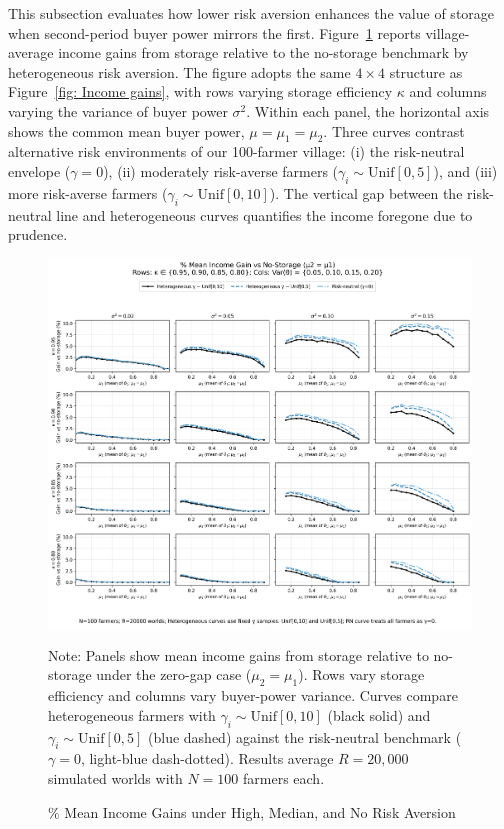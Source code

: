 This subsection evaluates how lower risk aversion enhances the value of storage when second-period buyer power mirrors the first. Figure~\ref{fig: Income gains with RN case} reports village-average income gains from storage relative to the no-storage benchmark by heterogeneous risk aversion. The figure adopts the same $4\times4$ structure as Figure~\ref{fig: Income gains}, with rows varying storage efficiency $\kappa$ and columns varying the variance of buyer power $\sigma^2$. Within each panel, the horizontal axis shows the common mean buyer power, $\mu=\mu_1=\mu_2$. Three curves contrast alternative risk environments of our 100-farmer village: (i) the risk-neutral envelope ($\gamma=0$), (ii) moderately risk-averse farmers ($\gamma_i\sim \mathrm{Unif}[0,5]$), and (iii) more risk-averse farmers ($\gamma_i\sim \mathrm{Unif}[0,10]$). The vertical gap between the risk-neutral line and heterogeneous curves quantifies the income foregone due to prudence.

\begin{figure}[ht]
    \centering
    \includegraphics[width=\linewidth]{model_figures/gainpct_grid_4x4_zero_gap_three_curves.png}
    \caption{$\%$ Mean Income Gains under High, Median, and No Risk Aversion}
    \label{fig: Income gains with RN case}
    \begin{tablenotes}[flushleft]
    \footnotesize
    \item Note: Panels show mean income gains from storage relative to no-storage under the zero-gap case ($\mu_2=\mu_1$). Rows vary storage efficiency and columns vary buyer-power variance. Curves compare heterogeneous farmers with $\gamma_i \sim \text{Unif}[0,10]$ (black solid) and $\gamma_i \sim \text{Unif}[0,5]$ (blue dashed) against the risk-neutral benchmark ($\gamma=0$, light-blue dash-dotted). Results average $R=20{,}000$ simulated worlds with $N=100$ farmers each.
    \end{tablenotes}
\end{figure}

